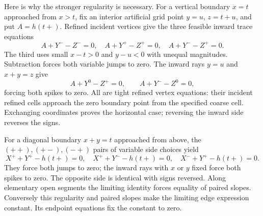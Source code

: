 \documentclass[11pt]{article}
\begin{document}
Here is why the stronger regularity is necessary. For a vertical boundary $x=t$ approached from $x>t$, fix an interior artificial grid point $y=u$, $z=t+u$, and put $A=h(t+)$. Refined incident vertices give the three feasible inward trace equations
\[
 A+Y^- -Z^-=0,\quad A+Y^+-Z^+=0,\quad A+Y^- -Z^+=0.
\]
The third uses small $x-t>0$ and $y-u<0$ with unequal magnitudes. Subtraction forces both variable jumps to zero. The inward rays $y=u$ and $x+y=z$ give
\[
 A+Y^0-Z^+=0,\qquad A+Y^--Z^0=0,
\]
forcing both spikes to zero. All are tight refined vertex equations: their incident refined cells approach the zero boundary point from the specified coarse cell. Exchanging coordinates proves the horizontal case; reversing the inward side reverses the signs.

For a diagonal boundary $x+y=t$ approached from above, the $(++),(+-),(-+)$ pairs of variable side choices yield
\[
 X^++Y^+-h(t+)=0,\quad X^++Y^--h(t+)=0,\quad
 X^-+Y^+-h(t+)=0.
\]
They force both jumps to zero; the inward rays with $x$ or $y$ fixed force both spikes to zero. The opposite side is identical with signs reversed. Along elementary open segments the limiting identity forces equality of paired slopes. Conversely this regularity and paired slopes make the limiting edge expression constant. Its endpoint equations fix the constant to zero.
\end{document}
